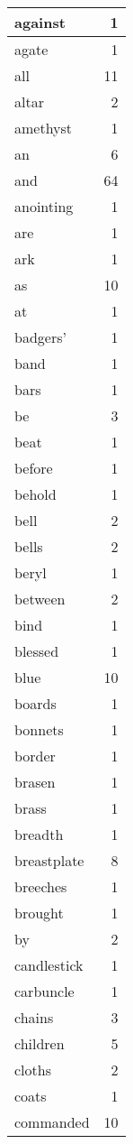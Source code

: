 \begin{center}
\begin{longtable}{l|r}
against & 1 \\ \hline
agate & 1 \\ \hline
all & 11 \\ \hline
altar & 2 \\ \hline
amethyst & 1 \\ \hline
an & 6 \\ \hline
and & 64 \\ \hline
anointing & 1 \\ \hline
are & 1 \\ \hline
ark & 1 \\ \hline
as & 10 \\ \hline
at & 1 \\ \hline
badgers' & 1 \\ \hline
band & 1 \\ \hline
bars & 1 \\ \hline
be & 3 \\ \hline
beat & 1 \\ \hline
before & 1 \\ \hline
behold & 1 \\ \hline
bell & 2 \\ \hline
bells & 2 \\ \hline
beryl & 1 \\ \hline
between & 2 \\ \hline
bind & 1 \\ \hline
blessed & 1 \\ \hline
blue & 10 \\ \hline
boards & 1 \\ \hline
bonnets & 1 \\ \hline
border & 1 \\ \hline
brasen & 1 \\ \hline
brass & 1 \\ \hline
breadth & 1 \\ \hline
breastplate & 8 \\ \hline
breeches & 1 \\ \hline
brought & 1 \\ \hline
by & 2 \\ \hline
candlestick & 1 \\ \hline
carbuncle & 1 \\ \hline
chains & 3 \\ \hline
children & 5 \\ \hline
cloths & 2 \\ \hline
coats & 1 \\ \hline
commanded & 10 \\ \hline

\end{longtable}
\end{center}
